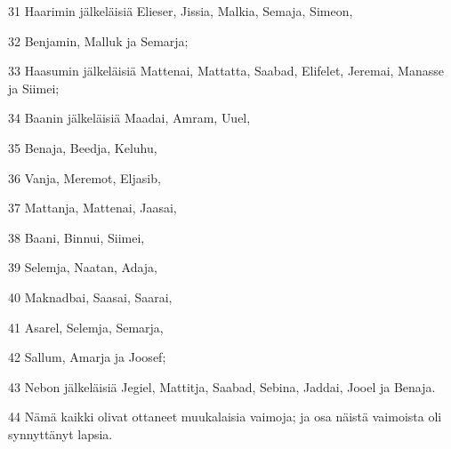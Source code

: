 \par 31 Haarimin jälkeläisiä Elieser, Jissia, Malkia, Semaja, Simeon,
\par 32 Benjamin, Malluk ja Semarja;
\par 33 Haasumin jälkeläisiä Mattenai, Mattatta, Saabad, Elifelet, Jeremai, Manasse ja Siimei;
\par 34 Baanin jälkeläisiä Maadai, Amram, Uuel,
\par 35 Benaja, Beedja, Keluhu,
\par 36 Vanja, Meremot, Eljasib,
\par 37 Mattanja, Mattenai, Jaasai,
\par 38 Baani, Binnui, Siimei,
\par 39 Selemja, Naatan, Adaja,
\par 40 Maknadbai, Saasai, Saarai,
\par 41 Asarel, Selemja, Semarja,
\par 42 Sallum, Amarja ja Joosef;
\par 43 Nebon jälkeläisiä Jegiel, Mattitja, Saabad, Sebina, Jaddai, Jooel ja Benaja.
\par 44 Nämä kaikki olivat ottaneet muukalaisia vaimoja; ja osa näistä vaimoista oli synnyttänyt lapsia.


